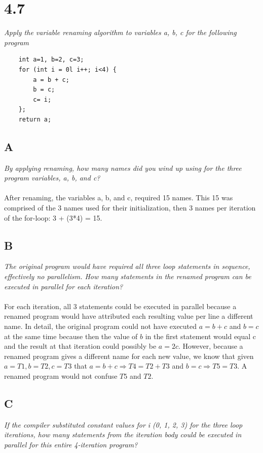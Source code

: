 \documentclass[10pt]{article}
\begin{document}
\section{4.7}
\textit{Apply the variable renaming algorithm to variables a, b, c for the following program}

\begin{lstlisting}
    int a=1, b=2, c=3;
    for (int i = 0l i++; i<4) {
        a = b + c;
        b = c;
        c= i;
    };
    return a;
\end{lstlisting}

\subsection{A}
\textit{By applying renaming, how many names did you wind up using for the three program
variables, a, b, and c?}
\paragraph{} After renaming, the variables a, b, and c, required 15 names. This 15 was comprised of the 3 names used for their initialization, then 
3 names per iteration of the for-loop: 3 + (3*4) = 15.

\subsection{B}
\textit{The original program would have required all three loop statements in sequence, effectively no parallelism. How many statements in the renamed program can be executed
in parallel for each iteration?}
\paragraph{}For each iteration, all 3 statements could be executed in parallel because a renamed program would have attributed each resulting value per line a different name. In detail,
the original program could not have executed $a = b + c$ and $b = c$ at the same time because then the value of $b$ in the first statement would equal c and the result at that iteration
could possibly be $a = 2c$. However, because a renamed program gives a different name for each new value, we know that given $a = T1, b = T2, c = T3$ that $a = b + c \Rightarrow T4 = T2 + T3$ and 
$b = c \Rightarrow T5 = T3$. A renamed program would not confuse $T5$ and $T2$. 

\subsection{C}
\textit{If the compiler substituted constant values for i (0, 1, 2, 3) for the three loop iterations,
how many statements from the iteration body could be executed in parallel for this
entire 4-iteration program?}
\end{document}
